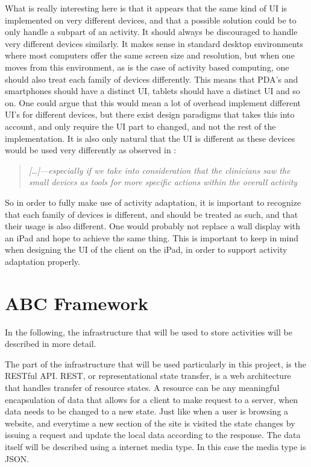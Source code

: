 What is really interesting here is that it appears that the same kind of UI is implemented on very different devices, and that a possible solution could be to only handle a subpart of an activity. It should always be discouraged to handle very different devices similarly. It makes sense in standard desktop environments where most computers offer the same screen size and resolution, but when one moves from this environment, as is the case of activity based computing, one should also treat each family of devices differently. This means that PDA's and smartphones should have a distinct UI, tablets should have a distinct UI and so on. One could argue that this would mean a lot of overhead implement different UI's for different devices, but there exist design paradigms that takes this into account, and only require the UI part to changed, and not the rest of the implementation. It is also only natural that the UI is different as these devices would be used very differently as observed in \citet{bardram2009}:

\begin{quotation}
	\emph{
		[\ldots]—especially if we take into consideration that the clinicians saw the small devices as tools for more specific actions within the overall activity
	} 
\end{quotation}

So in order to fully make use of activity adaptation, it is important to recognize that each family of devices is different, and should be treated as such, and that their usage is also different. One would probably not replace a wall display with an iPad and hope to achieve the same thing. This is important to keep in mind when designing the UI of the client on the iPad, in order to support activity adaptation properly.

\section{ABC Framework}
In the following, the infrastructure that will be used to store activities will be described in more detail.
\par\vspace{\baselineskip}
The part of the infrastructure that will be used particularly in this project, is the RESTful API. REST, or representational state transfer, is a web architecture that handles transfer of resource states. A resource can be any meaningful encapsulation of data that allows for a client to make request to a server, when data needs to be changed to a new state. Just like when a user is browsing a website, and everytime a new section of the site is visited the state changes by issuing a request and update the local data according to the response. The data itself will be described using a internet media type. In this case the media type is JSON.

